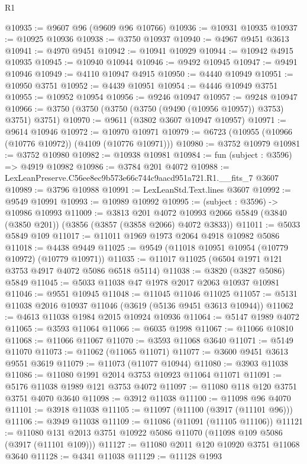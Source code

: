 \begin{lexlean}{R1}
\begin{coremodule}
@10935 := @9607 @96 (@9609 @96 @10766)
@10936 := @10931 @10935
@10937 := @10925 @10936
@10938 := @3750 @10937
@10940 := @4967 @9451 @3613
@10941 := @4970 @9451
@10942 := @10941 @10929
@10944 := @10942 @4915 @10935
@10945 := @10940 @10944
@10946 := @9492 @10945
@10947 := @9491 @10946
@10949 := @4110 @10947 @4915
@10950 := @4440 @10949
@10951 := @10950 @3751
@10952 := @4439 @10951
@10954 := @4446 @10949 @3751
@10955 := @10952 @10954
@10956 := @9246 @10947
@10957 := @9248 @10947
@10966 := @3750 (@3750 (@3750 (@3750 (@9490 (@10956 @10957)) @3753) @3751) @3751)
@10970 := @9611 (@3802 @3607 @10947 @10957)
@10971 := @9614 @10946
@10972 := @10970 @10971
@10979 := @6723 (@10955 (@10966 (@10776 @10972)) (@4109 (@10776 @10971)))
@10980 := @3752 @10979
@10981 := @3752 @10980
@10982 := @10938 @10981
@10984 := fun (subject : @3596) => @4919 @10982
@10986 := @3784 @201 @4072
@10988 := LexLeanPreserve.C56ee8ec9b573e66c744c9aacd951a721.R1.__fits_7 @3607
@10989 := @3796 @10988
@10991 := LexLeanStd.Text.lines @3607
@10992 := @9549 @10991
@10993 := @10989 @10992
@10995 := (subject : @3596) -> @10986 @10993
@11009 := @3813
    @201
    @4072
    @10993
    @2066
    @5849
    (@3840 (@3850 @201))
    (@3856 (@3857 (@3858 @2066) @4072 @3833))
@11011 := @5033 @5849 @109
@11017 := @11011 @1969 @1973 @2064 @4918 @10982 @5086
@11018 := @4438 @9449
@11025 := @9549 (@11018 @10951 @10954 (@10779 @10972) (@10779 @10971))
@11035 := @11017 @11025 (@6504 @1971 @121 @3753 @4917 @4072 @5086 @6518 @5114)
@11038 := @3820 (@3827 @5086) @5849
@11045 := @5033 @11038 @47 @1978 @2017 @2063 @10937 @10981
@11046 := @9551 @10945
@11048 := @11045 @11046 @11025
@11057 := @5131 @11038 @2016 @10937 @11046 (@3619 (@5136 @9451 @3613 @10944))
@11062 := @4613 @11038 @1984 @2015 @10924 @10936
@11064 := @5147 @1989 @4072
@11065 := @3593 @11064
@11066 := @6035 @1998
@11067 := @11066 @10810
@11068 := @11066 @11067
@11070 := @3593 @11068 @3640
@11071 := @5149 @11070
@11073 := @11062 (@11065 @11071)
@11077 := @3600 @9451 @3613 @9551 @3619
@11079 := @11073 (@11077 @10944)
@11080 := @3903 @11038
@11086 := @11080 @1991 @2014 @3753 @10923 @11064 @11071
@11091 := @5176 @11038 @1989 @121 @3753 @4072
@11097 := @11080 @118 @120 @3751 @3751 @4070 @3640
@11098 := @3912 @11038
@11100 := @11098 @96 @4070
@11101 := @3918 @11038
@11105 := @11097 (@11100 (@3917 (@11101 @96)))
@11106 := @3949 @11038
@11109 := @11086 (@11091 (@11105 @11106))
@11121 := @11080 @131 @2013 @3751 @10922 @5086 @11070 (@11098 @109 @5086 (@3917 (@11101 @109)))
@11127 := @11080 @2011 @120 @10920 @3751 @11068 @3640
@11128 := @4341 @11038
@11129 := @11128 @1993

\end{coremodule}
\end{lexlean}

